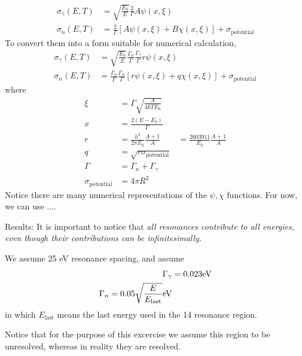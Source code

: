 \documentclass{school-22.211-notes}
\begin{document}
\begin{align}
\sigma_{\gamma} (E,T) &= \sqrt{\frac{E_0}{E}} \frac{2}{\Gamma} A \psi(x,\xi) \\
\sigma_{n} (E,T) &= \frac{2}{\Gamma} \left[ A \psi(x,\xi) + B \chi(x,\xi) \right] + \sigma_{\mathrm{potential}} 
\end{align}
To convert them into a form suitable for numerical calculation,
\begin{align}
\sigma_{\gamma} (E,T) &= \sqrt{\frac{E_0}{E}} \frac{\Gamma_n}{\Gamma} \frac{\Gamma_{\gamma}}{\Gamma} r \psi(x,\xi) \\
\sigma_{n} (E,T) &= \frac{\Gamma_n}{\Gamma} \frac{\Gamma_n}{\Gamma} \left[ r \psi(x,\xi) + q \chi(x,\xi) \right] + \sigma_{\mathrm{potential}} 
\end{align}
where
\begin{align}
\xi &= \Gamma \sqrt{\frac{A}{4 k T E_0}} \\
x &= \frac{2 (E-E_0)}{\Gamma} \\
r &= \frac{h^2}{2 \pi E_0} \frac{A+1}{A} &= \frac{2603911}{E_0} \frac{A+1}{A} \\
q &= \sqrt{ r \sigma_{\mathrm{potential}} } \\
\Gamma &= \Gamma_n + \Gamma_{\gamma} \\
\sigma_{\mathrm{potential}} &=  4 \pi R^2 
\end{align}
Notice there are many numerical representations of the $\psi, \chi$ functions. For now, we can use ....

Results: It is important to notice that \textit{all resonances contribute to all energies, even though their contributions can be infinitesimally}. 


We assume 25 eV resonance spacing, and assume
\begin{align}
\Gamma_{\gamma} &= 0.023 \mathrm{eV} \\
\Gamma_{n} = 0.05 \sqrt{\frac{E}{E_{\mathrm{last}}}}  \mathrm{eV}
\end{align}
in which $E_{\mathrm{last}}$ means the last energy used in the 14 resonance region. 

Notice that for the purpose of this excercise we assume this region to be unresolved, whereas in reality they are resolved. 
\end{document}
